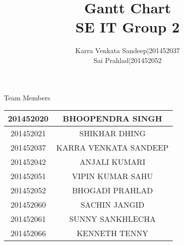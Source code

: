 \documentclass[journal,12pt,onecolumn,draftclsnofoot,]{IEEEtran}
\title{Gantt Chart \\  SE IT Group 2}
\author{Karra Venkata Sandeep|201452037\\Sai Prahlad|201452052}
\begin{document}
\maketitle
 Team Members
 
 
\begin{tabular}{|c|c|}
     \hline
     201452020 &
BHOOPENDRA SINGH \\
\hline
201452021 &
SHIKHAR DHING \\
\hline
201452037 &
KARRA VENKATA SANDEEP\\
\hline 
201452042 & 
ANJALI KUMARI \\
\hline 201452051
 & VIPIN KUMAR SAHU \\ 
 \hline
201452052 &
BHOGADI PRAHLAD \\ \hline
201452060 &
SACHIN
JANGID \\ \hline
201452061 &
SUNNY
SANKHLECHA \\ \hline
 201452066 &
KENNETH 
TENNY  \\ \hline
 \end{tabular}
 

 
 
\end{document}
